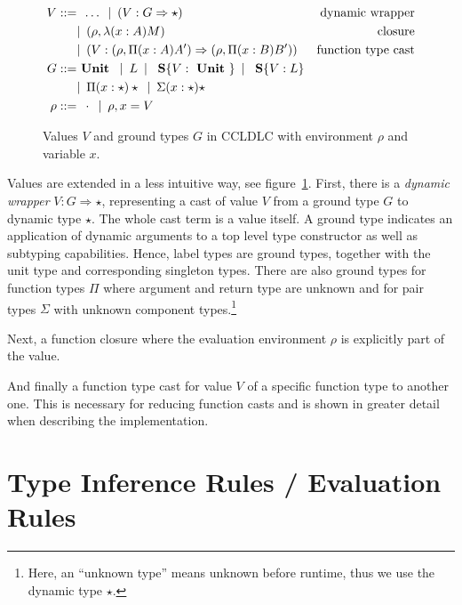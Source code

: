 \begin{figure}
\begin{align*}
 V ::= & \enspace \dots \enspace
        |\enspace (V : G \Rightarrow \star) & \text{dynamic wrapper}\\
      & |\enspace (\rho, \lambda(x:A)M) & \text{closure} \\
      & |\enspace (V : (\rho, \Pi(x:A) A') \Rightarrow (\rho, \Pi(x:B) B') ) & \text{function type cast} \\
 G ::= & \text{ \textbf{Unit} } \enspace|\enspace
    L \enspace|\enspace
    \text{ \textbf{S}}\{V: \text{ \textbf{Unit} }\} \enspace|\enspace
    \text{ \textbf{S}}\{V: L\} \\
    & |\enspace
    \Pi(x:\star)\star \enspace|\enspace
    \Sigma(x:\star)\star \\
 \rho ::= & \enspace \cdot \enspace|\enspace \rho, x = V
\end{align*}
\caption[Values $V$ and ground types $G$ in CCLDLC]{Values $V$ and ground types $G$ in CCLDLC with environment $\rho$ and variable $x$.}
\label{fig:ccldlc-extensions-values}
\end{figure}

Values are extended in a less intuitive way, see figure~\ref{fig:ccldlc-extensions-values}. First, there is a \emph{dynamic wrapper} $V : G \Rightarrow \star$, representing a cast of value $V$ from a ground type $G$ to dynamic type $\star$. The whole cast term is a value itself. A ground type indicates an application of dynamic arguments to a top level type constructor as well as subtyping capabilities. Hence, label types are ground types, together with the unit type and corresponding singleton types. There are also ground types for function types $\Pi$ where argument and return type are unknown and for pair types $\Sigma$ with unknown component types.\footnote{Here, an ``unknown type'' means unknown before runtime, thus we use the dynamic type $\star$.}

Next, a function closure where the evaluation environment $\rho$ is explicitly part of the value.

And finally a function type cast for value $V$ of a specific function type to another one. This is necessary for reducing function casts and is shown in greater detail when describing the implementation.

\section{Type Inference Rules / Evaluation Rules}\label{sec:ccldlc-inference-rules}

